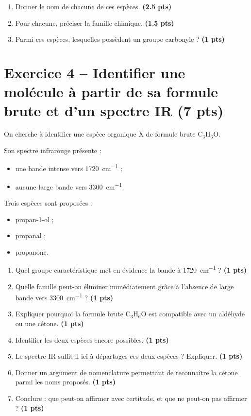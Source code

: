 \documentclass[11pt,a4paper]{article}
\newcommand{\pts}[1]{\hfill{\small\textbf{(#1 pts)}}}
\begin{document}
\begin{enumerate}[label=\textbf{\arabic*.},leftmargin=1.2em]
    \item Donner le nom de chacune de ces espèces. \pts{2.5}
    \item Pour chacune, préciser la famille chimique. \pts{1.5}
    \item Parmi ces espèces, lesquelles possèdent un groupe carbonyle ? \pts{1}
\end{enumerate}

\section*{Exercice 4 -- Identifier une molécule à partir de sa formule brute et d'un spectre IR \pts{7}}

On cherche à identifier une espèce organique X de formule brute C$_3$H$_6$O.

Son spectre infrarouge présente :
\begin{itemize}[leftmargin=1.2em]
    \item une bande intense vers \SI{1720}{cm^{-1}} ;
    \item aucune large bande vers \SI{3300}{cm^{-1}}.
\end{itemize}

Trois espèces sont proposées :
\begin{itemize}[leftmargin=1.2em]
    \item propan-1-ol ;
    \item propanal ;
    \item propanone.
\end{itemize}

\begin{enumerate}[label=\textbf{\arabic*.},leftmargin=1.2em]
    \item Quel groupe caractéristique met en évidence la bande à \SI{1720}{cm^{-1}} ? \pts{1}
    \item Quelle famille peut-on éliminer immédiatement grâce à l'absence de large bande vers \SI{3300}{cm^{-1}} ? \pts{1}
    \item Expliquer pourquoi la formule brute C$_3$H$_6$O est compatible avec un aldéhyde ou une cétone. \pts{1}
    \item Identifier les deux espèces encore possibles. \pts{1}
    \item Le spectre IR suffit-il ici à départager ces deux espèces ? Expliquer. \pts{1}
    \item Donner un argument de nomenclature permettant de reconnaître la cétone parmi les noms proposés. \pts{1}
    \item Conclure : que peut-on affirmer avec certitude, et que ne peut-on pas affirmer ? \pts{1}
\end{enumerate}
\end{document}
